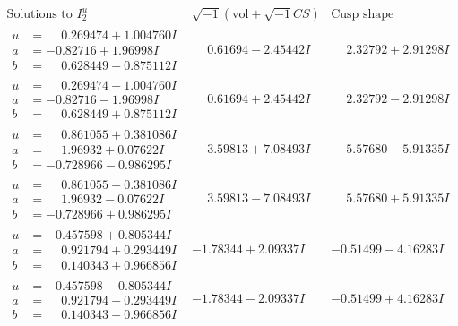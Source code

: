 \documentclass[1p]{elsarticle_modified}
\theoremstyle{definition}
\newcommand{\I}{\sqrt{-1}}
\begin{document}
$$\begin{array}{c|c|c}  
\text{Solutions to }I^u_{2}& \I (\text{vol} + \sqrt{-1}CS) & \text{Cusp shape}\\
 \hline 
\begin{aligned}
u &= \phantom{-}0.269474 + 1.004760 I \\
a &= -0.82716 + 1.96998 I \\
b &= \phantom{-}0.628449 - 0.875112 I\end{aligned}
 & \phantom{-}0.61694 - 2.45442 I & \phantom{-}2.32792 + 2.91298 I \\ \hline\begin{aligned}
u &= \phantom{-}0.269474 - 1.004760 I \\
a &= -0.82716 - 1.96998 I \\
b &= \phantom{-}0.628449 + 0.875112 I\end{aligned}
 & \phantom{-}0.61694 + 2.45442 I & \phantom{-}2.32792 - 2.91298 I \\ \hline\begin{aligned}
u &= \phantom{-}0.861055 + 0.381086 I \\
a &= \phantom{-}1.96932 + 0.07622 I \\
b &= -0.728966 - 0.986295 I\end{aligned}
 & \phantom{-}3.59813 + 7.08493 I & \phantom{-}5.57680 - 5.91335 I \\ \hline\begin{aligned}
u &= \phantom{-}0.861055 - 0.381086 I \\
a &= \phantom{-}1.96932 - 0.07622 I \\
b &= -0.728966 + 0.986295 I\end{aligned}
 & \phantom{-}3.59813 - 7.08493 I & \phantom{-}5.57680 + 5.91335 I \\ \hline\begin{aligned}
u &= -0.457598 + 0.805344 I \\
a &= \phantom{-}0.921794 + 0.293449 I \\
b &= \phantom{-}0.140343 + 0.966856 I\end{aligned}
 & -1.78344 + 2.09337 I & -0.51499 - 4.16283 I \\ \hline\begin{aligned}
u &= -0.457598 - 0.805344 I \\
a &= \phantom{-}0.921794 - 0.293449 I \\
b &= \phantom{-}0.140343 - 0.966856 I\end{aligned}
 & -1.78344 - 2.09337 I & -0.51499 + 4.16283 I \\ \hline\begin{aligned}

\end{aligned}
\end{array}$$
\end{document}
